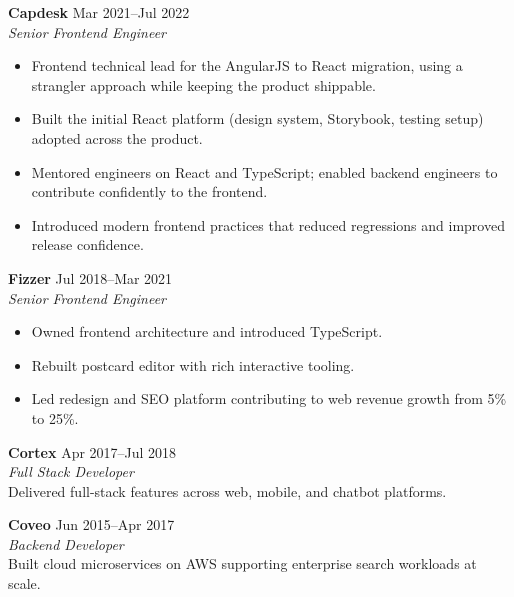 \documentclass[11pt]{article}
\begin{document}
\textbf{Capdesk} \hfill Mar 2021--Jul 2022\\
\textit{Senior Frontend Engineer}
\begin{itemize}
    \item Frontend technical lead for the AngularJS to React migration, using a strangler approach while keeping the product shippable.
    \item Built the initial React platform (design system, Storybook, testing setup) adopted across the product.
    \item Mentored engineers on React and TypeScript; enabled backend engineers to contribute confidently to the frontend.
    \item Introduced modern frontend practices that reduced regressions and improved release confidence.
\end{itemize}

\textbf{Fizzer} \hfill Jul 2018--Mar 2021\\
\textit{Senior Frontend Engineer}
\begin{itemize}
    \item Owned frontend architecture and introduced TypeScript.
    \item Rebuilt postcard editor with rich interactive tooling.
    \item Led redesign and SEO platform contributing to web revenue growth from 5\% to 25\%.
\end{itemize}

\textbf{Cortex} \hfill Apr 2017--Jul 2018\\
\textit{Full Stack Developer} \\
Delivered full-stack features across web, mobile, and chatbot platforms.

\textbf{Coveo} \hfill Jun 2015--Apr 2017\\
\textit{Backend Developer} \\
Built cloud microservices on AWS supporting enterprise search workloads at scale.
\end{document}

